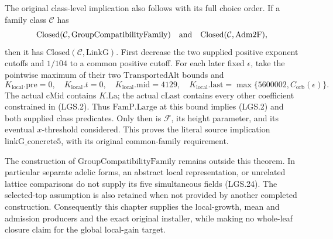 The original class-level implication also follows
with its full choice order.  If a family class
\(\mathcal C\) has
\[
 \mathrm{Closed}(\mathcal C,\mathrm{GroupCompatibilityFamily})
 \quad\hbox{and}\quad
 \mathrm{Closed}(\mathcal C,\mathrm{Adm2F}),
 \]
then it has \(\mathrm{Closed}(\mathcal C,\mathrm{LinkG})\).
First decrease the two supplied positive exponent
cutoffs and \(1/104\) to a common positive cutoff.
For each later fixed \(\epsilon\), take the pointwise
maximum of their two \(\mathrm{TransportedAlt}\)
bounds and
\[
 K_{\mathrm{local}}.\mathrm{pre}=0,\quad
 K_{\mathrm{local}}.t=0,\quad
 K_{\mathrm{local}}.\mathrm{mid}=4129,\quad
 K_{\mathrm{local}}.\mathrm{last}
             =\max\{5600002,C_{\mathrm{orb}}(\epsilon)\}.
                                                               \tag{LGS.40}
\]
The actual \(\mathrm{cMid}\) contains \(K.\mathrm{La}\);
the actual \(\mathrm{cLast}\) contains every other
coefficient constrained in (LGS.2).
Thus \(\mathrm{FamP.Large}\) at this bound implies
(LGS.2) and both supplied class predicates.
Only then is \(\mathcal F\), its height parameter,
and its eventual \(x\)-threshold considered.
This proves the literal source implication
\(\mathrm{linkG\_concrete5}\), with its original
common-family requirement.

The construction of \(\mathrm{GroupCompatibilityFamily}\)
remains outside this theorem.  In particular separate
adelic forms, an abstract local representation, or
unrelated lattice comparisons do not supply its five
simultaneous fields (LGS.24).  The selected-top
assumption is also retained when not provided by
another completed construction.  Consequently this
chapter supplies the local-growth, mean and admission
producers and the exact original installer, while
making no whole-leaf closure claim for the global
local-gain target.
